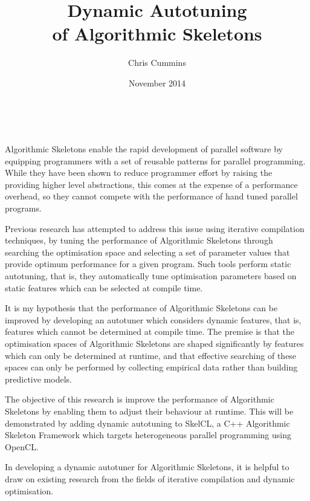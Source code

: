 \title{Dynamic Autotuning\\of Algorithmic Skeletons}
\author{Chris Cummins}
\date{November 2014}





\begin{center}
  \huge
  \textbf{\@title}
  \vspace{.5em}

  \normalsize
  \@author\\
  \@date
  \vspace{.5em}
\end{center}

Algorithmic Skeletons enable the rapid development of parallel
software by equipping programmers with a set of reusable patterns for
parallel programming. While they have been shown to reduce programmer
effort by raising the providing higher level abstractions, this comes
at the expense of a performance overhead, so they cannot compete with
the performance of hand tuned parallel programs.

Previous research has attempted to address this issue using iterative
compilation techniques, by tuning the performance of Algorithmic
Skeletons through searching the optimisation space and selecting a set
of parameter values that provide optimum performance for a given
program. Such tools perform static autotuning, that is, they
automatically tune optimisation parameters based on static features
which can be selected at compile time.

It is my hypothesis that the performance of Algorithmic Skeletons can
be improved by developing an autotuner which considers dynamic
features, that is, features which cannot be determined at compile
time. The premise is that the optimisation spaces of Algorithmic
Skeletons are shaped significantly by features which can only be
determined at runtime, and that effective searching of these spaces
can only be performed by collecting empirical data rather than
building predictive models.

The objective of this research is improve the performance of
Algorithmic Skeletons by enabling them to adjust their behaviour at
runtime. This will be demonstrated by adding dynamic autotuning to
SkelCL, a C++ Algorithmic Skeleton Framework which targets
heterogeneous parallel programming using OpenCL.

In developing a dynamic autotuner for Algorithmic Skeletons, it is
helpful to draw on existing research from the fields of iterative
compilation and dynamic optimisation.

